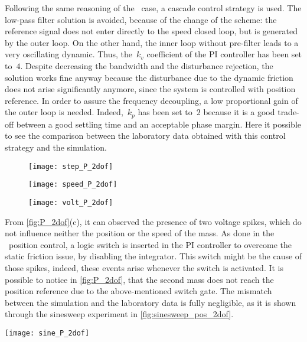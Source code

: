 Following the same reasoning of the \onedof~case, a cascade control strategy is used. The low-pass filter solution is avoided, because of the change of the scheme: the reference signal does not enter directly to the speed closed loop, but is generated by the outer loop. On the other hand, the inner loop without pre-filter leads to a very oscillating dynamic. Thus, the~$k_v$ coefficient of the PI controller has been set to~$4$. Despite decreasing the bandwidth and the disturbance rejection, the solution works fine anyway because the disturbance due to the dynamic friction does not arise significantly anymore, since the system is controlled with position reference.
In order to assure the frequency decoupling, a low proportional gain of the outer loop is needed. Indeed,~$k_p$ has been set to~$2$ because it is a good trade-off between a good settling time and an acceptable phase margin.
\newline
Here it possible to see the comparison between the laboratory data obtained with this control strategy and the simulation.
\begin{figure*}[h]
	\centering
	\begin{subfigure}{0.48\columnwidth}
		\texttt{[image: step\_P\_2dof]}
	\end{subfigure}
	\begin{subfigure}{0.45\columnwidth}
		\texttt{[image: speed\_P\_2dof]}
	\end{subfigure}
	\begin{subfigure}{0.45\columnwidth}
		\texttt{[image: volt\_P\_2dof]}
	\end{subfigure}
	\caption{Position control loop with $k_{p} =2$ with a position step of $\frac{\pi}{4}$}
	\label{fig:P_2dof}
\end{figure*}
\newpage
From \cref{fig:P_2dof}(c), it can observed the presence of two voltage spikes, which do not influence neither the position or the speed of the mass. As done in the \onedof\ position control, a logic switch is inserted in the PI controller to overcome the static friction issue, by disabling the integrator. This switch might be the cause of those spikes, indeed, these events arise whenever the switch is activated. 
It is possible to notice in \cref{fig:P_2dof}, that the second mass does not reach the position reference due to the above-mentioned switch gate.
The mismatch between the simulation and the laboratory data is fully negligible, as it is shown through the sinesweep experiment in \cref{fig:sinesweep_pos_2dof}.
\begin{figure*}[h]
	\centering
	\texttt{[image: sine\_P\_2dof]}
	\caption{Sineweep experiment from $0.1\ Hz$ to $1\ Hz$ in $100\ s$}
	\label{fig:sinesweep_pos_2dof}
\end{figure*}